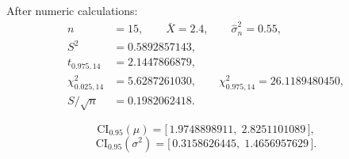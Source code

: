 \documentclass{article}
\begin{document}
After numeric calculations:
\[
    \begin{aligned}
        n                   & =15, \qquad \bar X=2.4, \qquad \hat\sigma_n^{2}=0.55,   \\
        S^{2}               & =0.5892857143,                                          \\
        t_{0.975,14}        & =2.1447866879,                                          \\
        \chi^{2}_{0.025,14} & =5.6287261030,\qquad \chi^{2}_{0.975,14}=26.1189480450, \\
        S/\sqrt{n}          & =0.1982062418.
    \end{aligned}
\]

\[
    \mathrm{CI}_{0.95}(\mu)=\big[\,1.9748898911,\;2.8251101089\,\big],
\]
\[
    \mathrm{CI}_{0.95}(\sigma^{2})=\big[\,0.3158626445,\;1.4656957629\,\big].
\]
\end{document}
